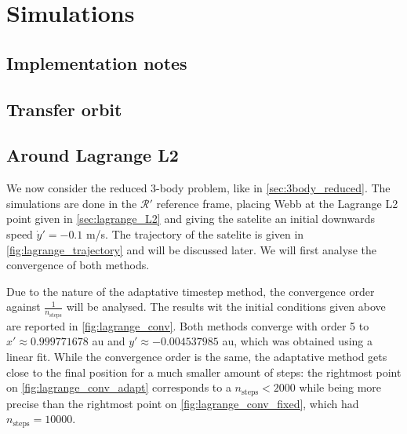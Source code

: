 \section{Simulations}

\subsection{Implementation notes}

\subsection{Transfer orbit}

\subsection{Around Lagrange L2}

We now consider the reduced 3-body problem, like in \ref{sec:3body_reduced}. The simulations are done in the \(\mathcal R'\) reference frame, placing Webb at the Lagrange L2 point given in \ref{sec:lagrange_L2} and giving the satelite an initial downwards speed \(\dot y' = -0.1\) m/s. The trajectory of the satelite is given in \autoref{fig:lagrange_trajectory} and will be discussed later. We will first analyse the convergence of both methods.

Due to the nature of the adaptative timestep method, the convergence order against \(\frac{1}{n_\textrm{steps}}\) will be analysed. The results wit the initial conditions given above are reported in \autoref{fig:lagrange_conv}. Both methods converge with order 5 to \(x' \approx 0.999771678\) au and \(y' \approx -0.004537985\) au, which was obtained using a linear fit. While the convergence order is the same, the adaptative method gets close to the final position for a much smaller amount of steps: the rightmost point on \autoref{fig:lagrange_conv_adapt} corresponds to a \(n_\textrm{steps} < 2000\) while being more precise than the rightmost point on \autoref{fig:lagrange_conv_fixed}, which had \(n_\textrm{steps} = 10000\).

